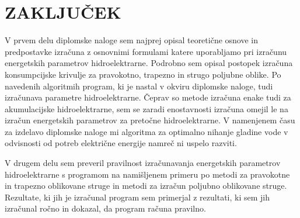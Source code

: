
\chapter{ZAKLJUČEK}

V prvem delu diplomske naloge sem najprej opisal teoretične osnove in predpostavke izračuna z osnovnimi formulami katere uporabljamo pri izračunu energetskih parametrov hidroelektrarne. Podrobno sem opisal postopek izračuna konsumpcijske krivulje za pravokotno, trapezno in strugo poljubne oblike. Po navedenih algoritmih program, ki je nastal v okviru diplomske naloge, tudi izračunava parametre hidroelektrarne. Čeprav so metode izračuna enake tudi za akumulacijske hidroelektrarne, sem se zaradi enostavnosti izračuna omejil le na izračun energetskih parametrov za pretočne hidroelektrarne. V namenjenem času za izdelavo diplomske naloge mi algoritma za optimalno nihanje gladine vode v odvisnosti od potreb električne energije namreč ni uspelo razviti.


V drugem delu sem preveril pravilnost izračunavanja energetskih parametrov hidroelektrarne s programom na namišljenem primeru po metodi za pravokotne in trapezno oblikovane struge in metodi za izračun poljubno oblikovane struge. Rezultate, ki jih je izračunal program sem primerjal z rezultati, ki sem jih izračunal ročno in dokazal, da program računa pravilno.

